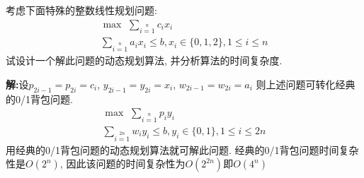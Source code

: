 \begin{problem}[习题5.3]
考虑下面特殊的整数线性规划问题:
\begin{align*}
&\max\,\, \sum\limits_{i=1}\limits^{n}c_i x_i\\
&\sum\limits_{i=1}\limits^{n} a_i x_i \leq b, x_i\in\{0, 1, 2\}, 1\leq i\leq n&
\end{align*}
试设计一个解此问题的动态规划算法, 并分析算法的时间复杂度.
\end{problem}
\begin{solution}
\textbf{解:}设$p_{2i-1} = p_{2i} = c_i$, $y_{2i-1} = y_{2i} = x_i$, $w_{2i-1} = w_{2i} = a_i$ 则上述问题可转化经典的0/1背包问题.
\begin{align*}
&\max\,\, \sum\limits_{i=1}\limits^{n}p_i y_i\\
&\sum\limits_{i=1}\limits^{2n} w_i y_i \leq b, y_i\in\{0, 1\}, 1\leq i\leq 2n&
\end{align*}
用经典的0/1背包问题的动态规划算法就可解此问题. 经典的0/1背包问题时间复杂性是$O(2^n)$, 因此该问题的时间复杂性为$O(2^{2n})$即$O(4^n)$
\end{solution}
